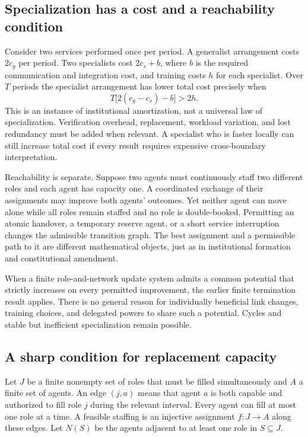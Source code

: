 \subsection{Specialization has a cost and a reachability condition}
Consider two services performed once per period. A generalist arrangement costs $2c_g$ per period. Two specialists cost $2c_s+b$, where $b$ is the required communication and integration cost, and training costs $h$ for each specialist. Over $T$ periods the specialist arrangement has lower total cost precisely when
\[
T\bigl[2(c_g-c_s)-b\bigr]>2h.
\]
This is an instance of institutional amortization, not a universal law of specialization. Verification overhead, replacement, workload variation, and lost redundancy must be added when relevant. A specialist who is faster locally can still increase total cost if every result requires expensive cross-boundary interpretation.

Reachability is separate. Suppose two agents must continuously staff two different roles and each agent has capacity one. A coordinated exchange of their assignments may improve both agents' outcomes. Yet neither agent can move alone while all roles remain staffed and no role is double-booked. Permitting an atomic handover, a temporary reserve agent, or a short service interruption changes the admissible transition graph. The best assignment and a permissible path to it are different mathematical objects, just as in institutional formation and constitutional amendment.

When a finite role-and-network update system admits a common potential that strictly increases on every permitted improvement, the earlier finite termination result applies. There is no general reason for individually beneficial link changes, training choices, and delegated powers to share such a potential. Cycles and stable but inefficient specialization remain possible.

\subsection{A sharp condition for replacement capacity}
Let $J$ be a finite nonempty set of roles that must be filled simultaneously and $A$ a finite set of agents. An edge $(j,a)$ means that agent $a$ is both capable and authorized to fill role $j$ during the relevant interval. Every agent can fill at most one role at a time. A feasible staffing is an injective assignment $f:J\to A$ along these edges. Let $N(S)$ be the agents adjacent to at least one role in $S\subseteq J$.


